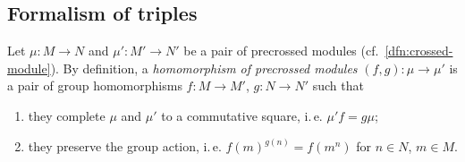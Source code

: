 \subsection{Formalism of triples}\label{subsec:triples}
Let $\mu\colon M \to N$ and $\mu' \colon M' \to N'$ be a pair of precrossed modules (cf.~\cref{dfn:crossed-module}).
By definition, a \textit{homomorphism of precrossed modules} $(f, g)\colon \mu \to \mu'$ is a pair of group homomorphisms $f\colon M \to M'$, $g\colon N \to N'$ such that
\begin{enumerate}[ref=CH\arabic*, label=CH\arabic*)]
    \item \label{ax:ch-cs} they complete $\mu$ and $\mu'$ to a commutative square, i.\,e. $\mu'f = g \mu$;
    \item \label{ax:ch-ga} they preserve the group action, i.\,e. ${f(m)}^{g(n)} = f(m^n)$ for $n \in N$, $m \in M$.
\end{enumerate}

